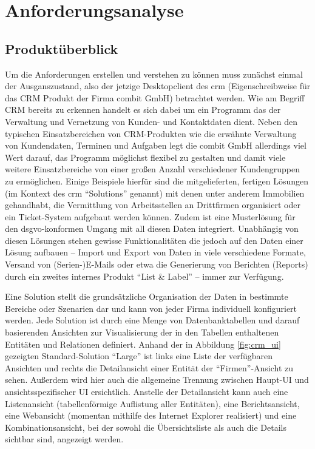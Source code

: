 \chapter{Anforderungsanalyse}
\label{chap:requirements}

\section{Produktüberblick}
Um die Anforderungen erstellen und verstehen zu können muss zunächst einmal der Ausganszustand, also der jetzige Desktopclient des \gls{crm} (Eigenschreibweise für das \gls{CRM} Produkt der Firma combit GmbH) betrachtet werden. Wie am Begriff \gls{CRM} bereits zu erkennen handelt es sich dabei um ein Programm das der Verwaltung und Vernetzung von Kunden- und Kontaktdaten dient. Neben den typischen Einsatzbereichen von \gls{CRM}-Produkten wie die erwähnte Verwaltung von Kundendaten, Terminen und Aufgaben legt die combit GmbH allerdings viel Wert darauf, das Programm möglichst flexibel zu gestalten und damit viele weitere Einsatzbereiche von einer großen Anzahl verschiedener Kundengruppen zu ermöglichen. Einige Beispiele hierfür sind die mitgelieferten, fertigen Lösungen (im Kontext des \gls{crm} ``Solutions'' genannt) mit denen unter anderem Immobilien gehandhabt, die Vermittlung von Arbeitsstellen an Drittfirmen organisiert oder ein Ticket-System aufgebaut werden können. Zudem ist eine Musterlösung für den \gls{dsgvo}-konformen Umgang mit all diesen Daten integriert. Unabhängig von diesen Lösungen stehen gewisse Funktionalitäten die jedoch auf den Daten einer Lösung aufbauen -- Import und Export von Daten in viele verschiedene Formate, Versand von (Serien-)E-Mails oder etwa die Generierung von Berichten (Reports) durch ein zweites internes Produkt ``List \& Label'' -- immer zur Verfügung.

Eine Solution stellt die grundsätzliche Organisation der Daten in bestimmte Bereiche oder Szenarien dar und kann von jeder Firma individuell konfiguriert werden. Jede Solution ist durch eine Menge von Datenbanktabellen und darauf basierenden Ansichten zur Visualisierung der in den Tabellen enthaltenen Entitäten und Relationen definiert. Anhand der in Abbildung \ref{fig:crm_ui} gezeigten Standard-Solution  ``Large''  ist links eine Liste der verfügbaren Ansichten und rechts die Detailansicht einer Entität der ``Firmen''-Ansicht zu sehen. Außerdem wird hier auch die allgemeine Trennung zwischen Haupt-UI und ansichtsspezifischer UI ersichtlich. Anstelle der Detailansicht kann auch eine Listenansicht (tabellenförmige Auflistung aller Entitäten), eine Berichtsansicht, eine Webansicht (momentan mithilfe des Internet Explorer realisiert) und eine Kombinationsansicht, bei der sowohl die Übersichtsliste als auch die Details sichtbar sind, angezeigt werden.

